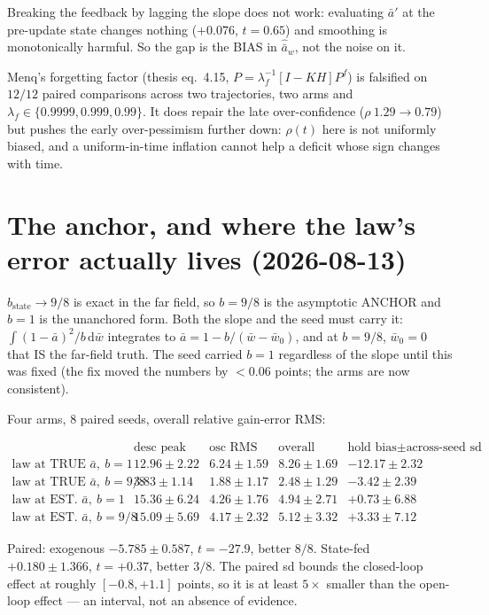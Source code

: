 \documentclass[11pt,a4paper,fontset=none]{ctexart}
\newcommand{\ba}{\bar{a}}
\newcommand{\bw}{\bar{w}}
\begin{document}
Breaking the feedback by lagging the slope does not work: evaluating $\ba'$ at
the pre-update state changes nothing ($+0.076$, $t = 0.65$) and smoothing is
monotonically harmful. So the gap is the BIAS in $\hat{\ba}_w$, not the noise on
it.

Menq's forgetting factor (thesis eq.\ 4.15,
$P = \lambda_f^{-1}[I-KH]P^f$) is falsified on $12/12$ paired comparisons across
two trajectories, two arms and $\lambda_f \in \{0.9999, 0.999, 0.99\}$. It does
repair the late over-confidence ($\rho\ 1.29 \to 0.79$) but pushes the early
over-pessimism further down: $\rho(t)$ here is not uniformly biased, and a
uniform-in-time inflation cannot help a deficit whose sign changes with time.


\section*{The anchor, and where the law's error actually lives (2026-08-13)}

$b_{\mathrm{state}} \to 9/8$ is exact in the far field, so $b = 9/8$ is the
asymptotic ANCHOR and $b = 1$ is the unanchored form. Both the slope and the
seed must carry it: $\int (1-\ba)^{2}/b\,\mathrm{d}\bw$ integrates to
$\ba = 1 - b/(\bw-\bw_0)$, and at $b = 9/8$, $\bw_0 = 0$ that IS the far-field
truth. The seed carried $b = 1$ regardless of the slope until this was fixed
(the fix moved the numbers by $< 0.06$ points; the arms are now consistent).

Four arms, 8 paired seeds, overall relative gain-error RMS:

\begin{equation*}
\begin{array}{lcccc}
 & \text{desc peak} & \text{osc RMS} & \text{overall} & \text{hold bias} \pm \text{across-seed sd} \\[0.2em]
\text{law at TRUE }\ba,\ b=1     & 12.96\pm2.22 & 6.24\pm1.59 & 8.26\pm1.69 & -12.17 \pm 2.32 \\
\text{law at TRUE }\ba,\ b=9/8   & 3.83\pm1.14  & 1.88\pm1.17 & 2.48\pm1.29 & -3.42 \pm 2.39 \\
\text{law at EST. }\ba,\ b=1     & 15.36\pm6.24 & 4.26\pm1.76 & 4.94\pm2.71 & +0.73 \pm 6.88 \\
\text{law at EST. }\ba,\ b=9/8   & 15.09\pm5.69 & 4.17\pm2.32 & 5.12\pm3.32 & +3.33 \pm 7.12
\end{array}
\end{equation*}

Paired: exogenous $-5.785 \pm 0.587$, $t = -27.9$, better $8/8$. State-fed
$+0.180 \pm 1.366$, $t = +0.37$, better $3/8$. The paired sd bounds the
closed-loop effect at roughly $[-0.8, +1.1]$ points, so it is at least $5\times$
smaller than the open-loop effect --- an interval, not an absence of evidence.
\end{document}
